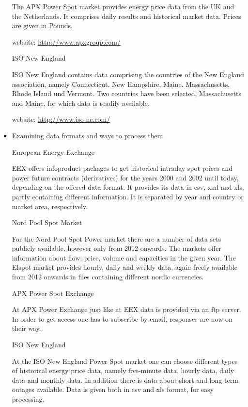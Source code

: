 \documentclass[a4paper]{article}
\begin{document}
\begin{itemize}
The APX Power Spot market provides energy price data from the UK and the Netherlands. It comprises daily results and historical market data. Prices are given in Pounds. 

	website: \url{http://www.apxgroup.com/}

	\subitem ISO New England
	
	ISO New England contains data comprising the countries of the New England association, namely Connecticut, New Hampshire, Maine, Massachusetts, Rhode Island und Vermont. Two countries have been selected, Massachusetts and Maine, for which data is readily available. 
	
	website: \url{http://www.iso-ne.com/}

\item Examining data formats and ways to process them

	\subitem European Energy Exchange
	
	EEX offers infoproduct packages to get historical intraday spot prices and power future contracts (derivatives) for the years 2000 and 2002 until today, depending on the offered data format. 
	It provides its data in csv, xml and xls, partly containing different information. It is separated by year and country or market area, respectively. 
	

	\subitem Nord Pool Spot Market
	
	For the Nord Pool Spot Power market there are a number of data sets publicly available, however only from 2012 onwards. 
	The markets offer information about flow, price, volume and capacities in the given year. The Elspot market provides hourly, daily and weekly data, again freely available from 2012 onwards in files containing different nordic currencies.  

	\subitem APX Power Spot Exchange
	
	At APX Power Exchange just like at EEX data is provided via an ftp server. In order to get access one has to subscribe by email, responses are now on their way. 
	
	\subitem ISO New England
	
	At the ISO New England Power Spot market one can choose different types of historical energy price data, namely five-minute data, hourly data, daily data and monthly data. In addition there is data about short and long term outages available. 
	Data is given both in csv and xls format, for easy processing. 

\end{itemize}
\end{document}
